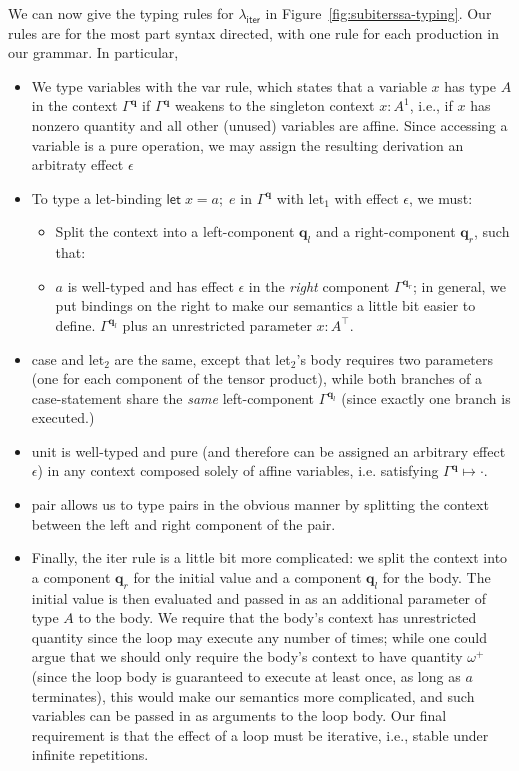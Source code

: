 \documentclass[acmsmall,screen,review]{acmart}
\newcommand{\mb}[1]{\ensuremath{\mathbf{#1}}}
\newcommand{\ms}[1]{\ensuremath{\mathsf{#1}}}
\newcommand{\letexpr}[3]{\ensuremath{\ms{let}\;#1 = #2;\;#3}}
\newcommand{\cwk}[2]{#1 \mapsto #2}
\newcommand{\brle}[1]{{\textsf{#1}}}
\newcommand{\subiterssa}{\(\lambda_{\ms{iter}}\)}
\newcommand{\oneq}{1}
\newcommand{\cpyq}{\omega^+}
\begin{document}
We can now give the typing rules for \subiterssa{} in Figure~\ref{fig:subiterssa-typing}. Our rules
are for the most part syntax directed, with one rule for each production in our grammar. In
particular,
\begin{itemize}
  \item We type variables with the \brle{var} rule, which states that a variable $x$ has type $A$ in
  the context $\Gamma^{\mb{q}}$ if $\Gamma^{\mb{q}}$ weakens to the singleton context $x: A^\oneq$,
  i.e., if $x$ has nonzero quantity and all other (unused) variables are affine. Since accessing a
  variable is a pure operation, we may assign the resulting derivation an arbitraty effect
  $\epsilon$
  \item To type a let-binding $\letexpr{x}{a}{e}$ in $\Gamma^{\mb{q}}$ with \brle{let$_1$} with
  effect $\epsilon$, we must:
  \begin{itemize}
    \item Split the context into a left-component $\mb{q}_l$ and a right-component
    $\mb{q}_r$, such that:
    \item $a$ is well-typed and has effect $\epsilon$ in the \emph{right} component
    $\Gamma^{\mb{q}_r}$; in general, we put bindings on the right to make our semantics a little bit
    easier to define. $\Gamma^{\mb{q}_l}$ plus an unrestricted parameter $x: A^\top$.
  \end{itemize}
  \item \brle{case} and \brle{let$_2$} are the same, except that \brle{let$_2$}'s body requires two
  parameters (one for each component of the tensor product), while both branches of a case-statement
  share the \emph{same} left-component $\Gamma^{\mb{q}_l}$ (since exactly one branch is executed.)
  \item \brle{unit} is well-typed and pure (and therefore can be assigned an arbitrary effect
  $\epsilon$) in any context composed solely of affine variables, i.e. satisfying
  $\cwk{\Gamma^{\mb{q}}}{\cdot}$.
  \item \brle{pair} allows us to type pairs in the obvious manner by splitting the context between
  the left and right component of the pair.
  \item Finally, the \brle{iter} rule is a little bit more complicated: we split the context into a
  component $\mb{q}_r$ for the initial value and a component $\mb{q}_l$ for the body. The initial
  value is then evaluated and passed in as an additional parameter of type $A$ to the body. We
  require that the body's context has unrestricted quantity since the loop may execute any number of
  times; while one could argue that we should only require the body's context to have quantity
  $\cpyq$ (since the loop body is guaranteed to execute at least once, as long as $a$ terminates),
  this would make our semantics more complicated, and such variables can be passed in as arguments
  to the loop body. Our final requirement is that the effect of a loop must be iterative, i.e.,
  stable under infinite repetitions.
\end{itemize}
\end{document}

